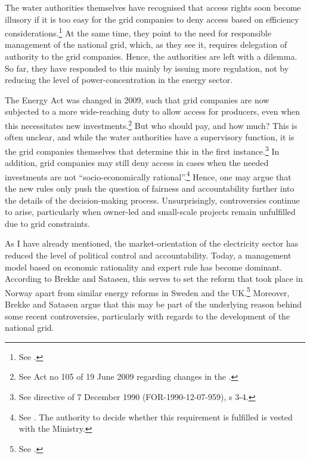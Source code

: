The water authorities themselves have recognised that access rights soon become illusory if it is too easy for the grid companies to deny access based on efficiency considerations.\footnote{See \cite{otprp62}.} At the same time, they point to the need for responsible management of the national grid, which, as they see it, requires delegation of authority to the grid companies. Hence, the authorities are left with a dilemma. So far, they have responded to this mainly by issuing more regulation, not by reducing the level of power-concentration in the energy sector.

The Energy Act was changed in 2009, such that grid companies are now subjected to a more wide-reaching duty to allow access for producers, even when this necessitates new investments.\footnote{See Act no 105 of 19 June 2009 regarding changes in the \cite{ea90}.} But who should pay, and how much? This is often unclear, and while the water authorities have a supervisory function, it is the grid companies themselves that determine this in the first instance.\footnote{See directive of 7 December 1990 (FOR-1990-12-07-959), s 3-4.} In addition, grid companies may still deny access in cases when the needed investments are not ``socio-economically rational''.\footnote{See \cite[3-4]{ea90}. The authority to decide whether this requirement is fulfilled is vested with the Ministry.} Hence, one may argue that the new rules only push the question of fairness and accountability further into the details of the decision-making process. Unsurprisingly, controversies continue to arise, particularly when owner-led and small-scale projects remain unfulfilled due to grid constraints.


As I have already mentioned, the market-orientation of the electricity sector has reduced the level of political control and accountability. Today, a management model based on economic rationality and expert rule has become dominant. According to Brekke and Sataøen, this serves to set the reform that took place in Norway apart from similar energy reforms in Sweden and the UK.\footnote{See \cite{brekke12}.} Moreover, Brekke and Sataøen argue that this may be part of the underlying reason behind some recent controversies, particularly with regards to the development of the national grid. 

